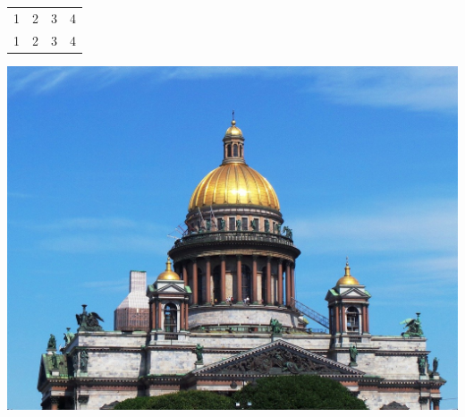 \documentclass{article}
\begin{document}
\begin{tabular}{ | c | c | c | c | }
	1 & 2 & 3 & 4 \\
	1 & 2 & 3 & 4
\end{tabular}
\includegraphics[scale=0.15]{spb_st_isaacs_2.jpg}
\end{document}
